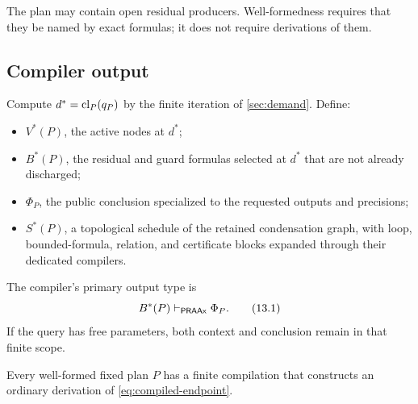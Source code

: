 The plan may contain open residual producers.  Well-formedness requires that
they be named by exact formulas; it does not require derivations of them.

\subsection{Compiler output}

Compute \(d^*=\operatorname{cl}_P(q_P)\) by the finite iteration of
\cref{sec:demand}.  Define:
\begin{itemize}
  \item \(V^*(P)\), the active nodes at \(d^*\);
  \item \(B^*(P)\), the residual and guard formulas selected at \(d^*\) that
        are not already discharged;
  \item \(\Phi_P\), the public conclusion specialized to the requested
        outputs and precisions;
  \item \(S^*(P)\), a topological schedule of the retained condensation graph,
        with loop, bounded-formula, relation, and certificate blocks expanded
        through their dedicated compilers.
\end{itemize}
The compiler's primary output type is
\[
  B^*(P)\vdash_{\mathsf{PRAAx}}\Phi_P.
  \tag{13.1}\label{eq:compiled-endpoint}
\]
If the query has free parameters, both context and conclusion remain in that
finite scope.

\begin{theorem}
\label{thm:darc-soundness}
Every well-formed fixed plan \(P\) has a finite compilation that constructs an
ordinary derivation of \eqref{eq:compiled-endpoint}.
\end{theorem}

